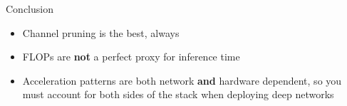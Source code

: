 \documentclass[xcolor=dvipsnames]{beamer}
\begin{document}
\begin{frame}{Conclusion}
    
    \begin{itemize}
        \item Channel pruning is the best, always
        \item FLOPs are \textbf{not} a perfect proxy for inference time
        \item Acceleration patterns are both network \textbf{and} hardware dependent, so you must account for both sides of the stack when deploying deep networks 
    \end{itemize}
    
\end{frame}
\end{document}
